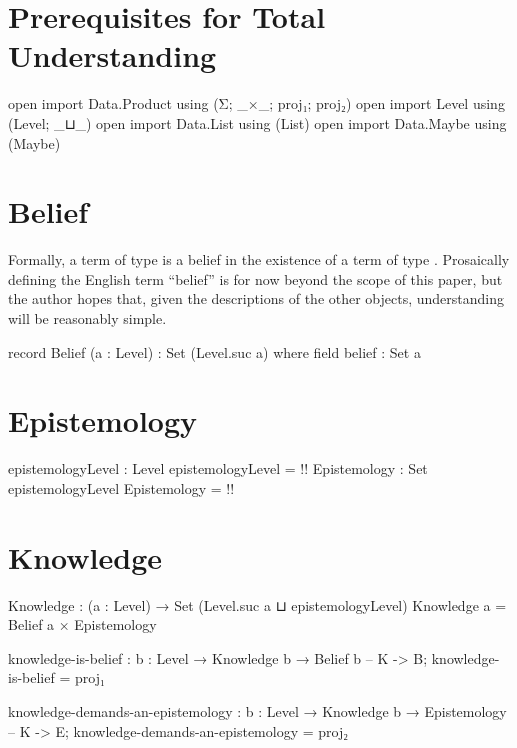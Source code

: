 \documentclass{article}
\begin{document}
\section{Prerequisites for Total Understanding}

\begin{code}
open import Data.Product using (Σ; _×_; proj₁; proj₂)
open import Level using (Level; _⊔_)
open import Data.List using (List)
open import Data.Maybe using (Maybe)
\end{code}

\section{Belief}
Formally, a term  of type   is a belief in the existence of a term of type  .  Prosaically defining the English term ``belief'' is for now beyond the scope of this paper, but the author hopes that, given the descriptions of the other objects, understanding  will be reasonably simple.

\begin{code}
record Belief (a : Level) : Set (Level.suc a) where
  field
    belief : Set a
\end{code}

\section{Epistemology}

\begin{code}
epistemologyLevel : Level
epistemologyLevel = {!!}
Epistemology : Set epistemologyLevel
Epistemology = {!!}
\end{code}

\section{Knowledge}

\begin{code}
Knowledge : (a : Level) → Set (Level.suc a ⊔ epistemologyLevel)
Knowledge a = Belief a × Epistemology
\end{code}

\begin{code}
knowledge-is-belief : {b : Level} → Knowledge b → Belief b -- K -> B;
knowledge-is-belief = proj₁
\end{code}

\begin{code}
knowledge-demands-an-epistemology :
  {b : Level} → Knowledge b → Epistemology -- K -> E;
knowledge-demands-an-epistemology = proj₂
\end{code}
\end{document}
